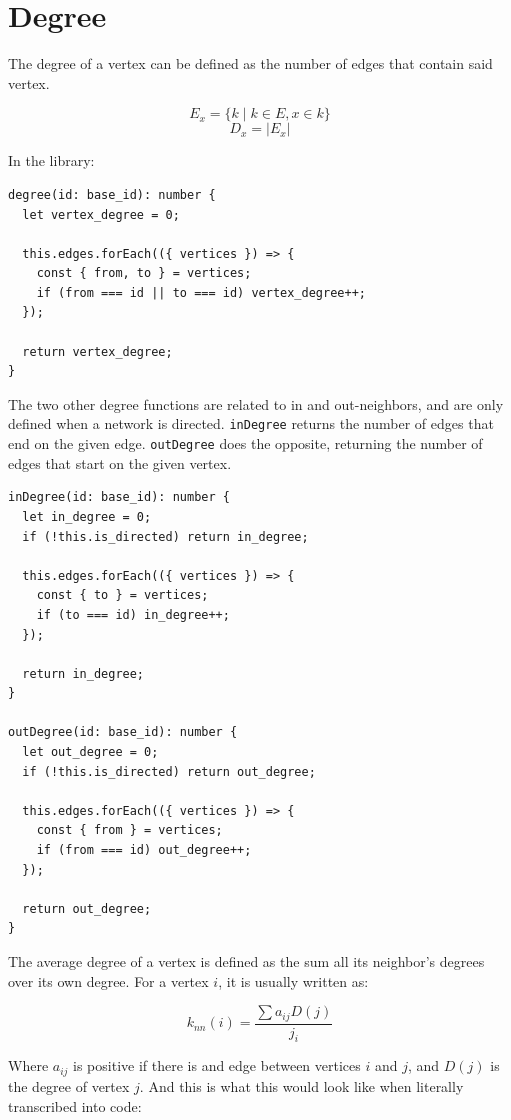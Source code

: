 \section{Degree}

The degree of a vertex can be defined as the number of edges that contain said vertex.

$$E_x=\{k \mid k \in E, x \in k\}$$
$$D_x=|E_x|$$

In the library:

\begin{verbatim}
degree(id: base_id): number {
  let vertex_degree = 0;

  this.edges.forEach(({ vertices }) => {
    const { from, to } = vertices;
    if (from === id || to === id) vertex_degree++;
  });

  return vertex_degree;
}
\end{verbatim}

The two other degree functions are related to in and out-neighbors,
and are only defined when a network is directed.
\texttt{inDegree} returns the number of edges that end on the given edge.
\texttt{outDegree} does the opposite,
returning the number of edges that start on the given vertex.

\begin{verbatim}
inDegree(id: base_id): number {
  let in_degree = 0;
  if (!this.is_directed) return in_degree;

  this.edges.forEach(({ vertices }) => {
    const { to } = vertices;
    if (to === id) in_degree++;
  });

  return in_degree;
}

outDegree(id: base_id): number {
  let out_degree = 0;
  if (!this.is_directed) return out_degree;

  this.edges.forEach(({ vertices }) => {
    const { from } = vertices;
    if (from === id) out_degree++;
  });

  return out_degree;
}
\end{verbatim}

The average degree of a vertex is defined as the sum all its neighbor's degrees over its own degree.
For a vertex $i$, it is usually written as:

$$k_{nn}(i)=\frac{\sum{a_{ij}D(j)}}{j_i}$$

Where $a_{ij}$ is positive if there is and edge between vertices $i$ and $j$,
and $D(j)$ is the degree of vertex $j$.
And this is what this would look like when literally transcribed into code:

